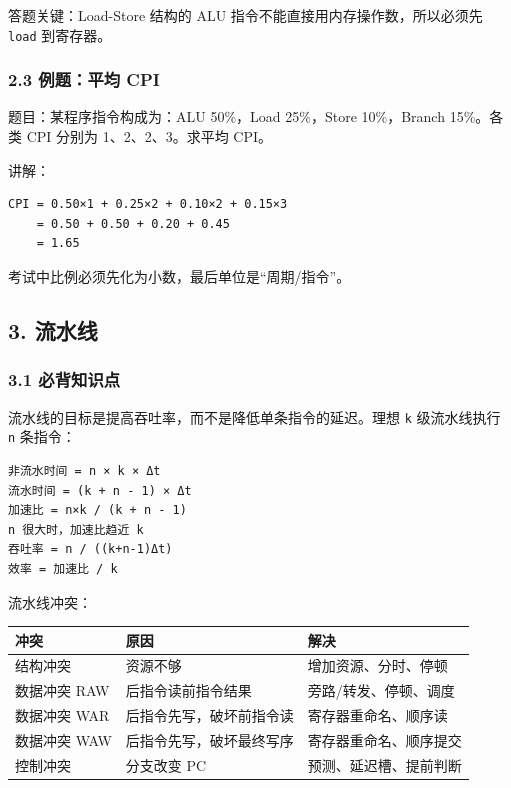 \documentclass[
]{ctexart}
\newcommand{\passthrough}[1]{#1}
\newcounter{none} %
\begin{document}
答题关键：Load-Store 结构的 ALU 指令不能直接用内存操作数，所以必须先
\passthrough{\lstinline!load!} 到寄存器。

\subsubsection{2.3 例题：平均 CPI}\label{ux4f8bux9898ux5e73ux5747-cpi}

题目：某程序指令构成为：ALU 50\%，Load 25\%，Store 10\%，Branch
15\%。各类 CPI 分别为 1、2、2、3。求平均 CPI。

讲解：

\begin{lstlisting}
CPI = 0.50×1 + 0.25×2 + 0.10×2 + 0.15×3
    = 0.50 + 0.50 + 0.20 + 0.45
    = 1.65
\end{lstlisting}

考试中比例必须先化为小数，最后单位是``周期/指令''。

\subsection{3. 流水线}\label{ux6d41ux6c34ux7ebf}

\subsubsection{3.1 必背知识点}\label{ux5fc5ux80ccux77e5ux8bc6ux70b9-2}

流水线的目标是提高吞吐率，而不是降低单条指令的延迟。理想
\passthrough{\lstinline!k!} 级流水线执行 \passthrough{\lstinline!n!}
条指令：

\begin{lstlisting}
非流水时间 = n × k × Δt
流水时间 = (k + n - 1) × Δt
加速比 = n×k / (k + n - 1)
n 很大时，加速比趋近 k
吞吐率 = n / ((k+n-1)Δt)
效率 = 加速比 / k
\end{lstlisting}

流水线冲突：

{\def\LTcaptype{none} %
\begin{longtable}[]{@{}lll@{}}
\toprule\noalign{}
冲突 & 原因 & 解决 \\
\midrule\noalign{}
\endhead
\bottomrule\noalign{}
\endlastfoot
结构冲突 & 资源不够 & 增加资源、分时、停顿 \\
数据冲突 RAW & 后指令读前指令结果 & 旁路/转发、停顿、调度 \\
数据冲突 WAR & 后指令先写，破坏前指令读 & 寄存器重命名、顺序读 \\
数据冲突 WAW & 后指令先写，破坏最终写序 & 寄存器重命名、顺序提交 \\
控制冲突 & 分支改变 PC & 预测、延迟槽、提前判断 \\
\end{longtable}
}
\end{document}
